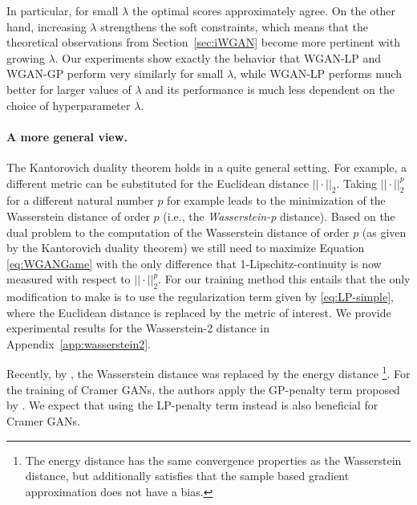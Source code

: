 \documentclass{article} %
\newcommand{\RR}[1][]{\mathbb{R}^{#1}}
\newcommand{\norm}[1]{||{#1}||_2}
\newcommand{\Li}[1]{\mathcal{L}ip_{#1}}
\begin{document}
In particular, for small $\lambda$ the optimal scores approximately agree. On the other hand, increasing $\lambda$ strengthens the soft constraints, which means that the theoretical observations from Section~\ref{sec:iWGAN} become more pertinent with growing $\lambda$. Our experiments show exactly the behavior that WGAN-LP and WGAN-GP perform very similarly for small $\lambda$, while WGAN-LP performs much better for larger values of $\lambda$ and its performance is much less dependent on the choice of hyperparameter $\lambda$.


\paragraph{A more general view.}

The Kantorovich duality theorem holds in a quite general setting. For example, a different metric can be substituted for the Euclidean distance $\norm{\cdot}$. Taking $\norm{\cdot}^p$ for a different natural number $p$ for example leads to the minimization of the Wasserstein distance of order $p$ (i.e., the \emph{Wasserstein-p} distance). %
Based on the dual problem to the computation of the Wasserstein distance of order $p$ (as given by the Kantorovich duality theorem) we still need to maximize Equation \eqref{eq:WGANGame}
with the only difference that 1-Lipschitz-continuity is now measured with respect to $\norm{\cdot}^p$. For our training method this entails that the only modification to make is to use the regularization term given by \eqref{eq:LP-simple}, where the Euclidean distance is replaced by the metric of interest. We provide experimental results for the Wasserstein-2 distance in Appendix~\ref{app:wasserstein2}.

Recently, by \citet{CramerGAN}, the Wasserstein distance was replaced by the energy distance \footnote{The energy distance \citep{Szekely} has the same convergence properties as the Wasserstein distance, but additionally satisfies that the sample based gradient approximation does not have a bias.}. For the training of Cramer GANs, the authors apply the GP-penalty term proposed by \citet{iWGAN}. We expect that using the LP-penalty term instead is also beneficial for Cramer GANs.
\end{document}

